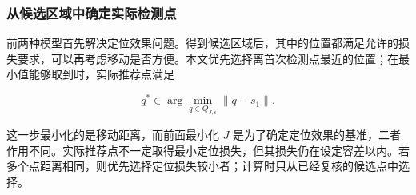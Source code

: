 \subsubsection{从候选区域中确定实际检测点}

前两种模型首先解决定位效果问题。得到候选区域后，其中的位置都满足允许的损失要求，可以再考虑移动是否方便。本文优先选择离首次检测点最近的位置；在最小值能够取到时，实际推荐点满足

\begin{equation}
 q^*\in\arg\min_{q\in Q_{J,\epsilon}}\|q-s_1\|.
 \label{eq:q2-candidate-selection}
\end{equation}

这一步最小化的是移动距离，而前面最小化 \(J\) 是为了确定定位效果的基准，二者作用不同。实际推荐点不一定取得最小定位损失，但其损失仍在设定容差以内。若多个点距离相同，则优先选择定位损失较小者；计算时只从已经复核的候选点中选择。

